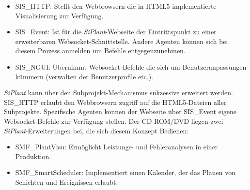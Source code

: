 \begin{itemize}
	\item SIS\_HTTP: Stellt den Webbrowsern die in HTML5 implementierte Visualisierung zur Verfügung.
	\item SIS\_Event: Ist für die \textit{SiPlant}-Webseite der Eintrittspunkt zu einer erweiterbaren Websocket-Schnittstelle. Andere Agenten können sich bei diesem Prozess anmelden um Befehle entgegenzunehmen.
	\item SIS\_NGUI: Übernimmt Websocket-Befehle die sich um Benutzeranpassungen kümmern (verwalten der Benutzerprofile etc.).
\end{itemize}

\textit{SiPlant} kann über den Subprojekt-Mechanismus sukzessive erweitert werden.\\ SIS\_HTTP erlaubt den Webbrowsern zugriff auf die HTML5-Dateien 
aller Subprojekte. Spezifische Agenten können der Webseite über SIS\_Event eigene Websocket-Befehle zur Verfügung stellen. Der CD-ROM/DVD liegen zwei
\textit{SiPlant}-Erweiterungen bei, die sich diesem Konzept Bedienen:

\begin{itemize}
	\item SMF\_PlantVisu: Ermöglicht Leistungs- und Fehleranalysen in einer Produktion.
	\item SMF\_SmartScheduler: Implementiert einen Kalender, der das Planen von Schichten und Ereignissen erlaubt. 
\end{itemize}
